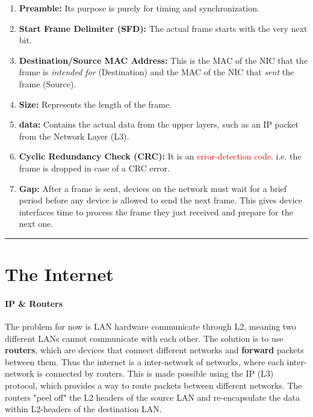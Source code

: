 \documentclass[openany,12pt]{book}
\newcommand{\red}[1]{\textcolor{Red}{#1}}
\begin{document}
\begin{enumerate}
    \item \textbf{Preamble:} Its purpose is purely for timing and synchronization. 

    \item \textbf{Start Frame Delimiter (SFD):} The actual frame starts with the very next bit.

    \item \textbf{Destination/Source MAC Address:}
    This is the MAC of the NIC that the frame is \textit{intended for} (Destination) and the MAC of the NIC that \textit{sent} the frame (Source).

    \item \textbf{Size:} Represents the length of the frame.

    \item \textbf{data:} Contains the actual data from the upper layers, such as an IP packet from the Network Layer (L3).

    \item \textbf{Cyclic Redundancy Check (CRC):} It is an \red{error-detection code}. i.e. the frame is dropped in case of a CRC error.

    \item \textbf{Gap:} After a frame is sent, devices on the network must wait for a brief period before any device is allowed to send the next frame. This gives device interfaces time to process the frame they just received and prepare for the next one.
\end{enumerate}


\noindent\rule{\linewidth}{0.5pt}


\section*{The Internet}

\paragraph{IP \& Routers} The problem for now is LAN hardware communicate through L2, meaning two different LANs cannot communicate with each other. The solution is to use \textbf{routers}, which are devices that connect different networks and \textbf{forward} packets between them. Thus the internet is a inter-network of networks, where each inter-network is connected by routers. This is made possible using the IP (L3) protocol, which provides a way to route packets between different networks. The routers "peel off" the L2 headers of the source LAN and re-encapsulate the data within L2-headers of the destination LAN.  
\end{document}
